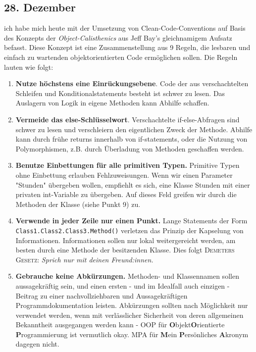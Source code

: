 \subsection{28. Dezember}
ich habe mich heute mit der Umsetzung von Clean-Code-Conventions auf Basis des Konzepts der \textit{Object-Calisthenics} aus Jeff Bay's gleichnamigem Aufsatz befasst. Diese Konzept ist eine Zusammenstellung aus 9 Regeln, die lesbaren und einfach zu wartenden objektorientierten Code ermöglichen sollen. Die Regeln lauten wie folgt:
\begin{enumerate}
    \item \textbf{Nutze höchstens eine Einrückungsebene}. Code der aus verschachtelten Schleifen und Konditionalstatements besteht ist schwer zu lesen. Das Auslagern von Logik in eigene Methoden kann Abhilfe schaffen.
    \item \textbf{Vermeide das else-Schlüsselwort}. Verschachtelte if-else-Abfragen sind schwer zu lesen und verschleiern den eigentlichen Zweck der Methode. Abhilfe kann durch frühe returns innerhalb von if-statements, oder die Nutzung von Polymorphismen, z.B. durch Überladung von Methoden geschaffen werden.
    \item \textbf{Benutze Einbettungen für alle primitiven Typen.} Primitive Typen ohne Einbettung erlauben Fehlzuweisungen. Wenn wir einen Parameter "Stunden" übergeben wollen, empfiehlt es sich, eine Klasse Stunden mit einer privaten int-Variable zu übergeben. Auf dieses Feld greifen wir durch die Methoden der Klasse (siehe Punkt 9) zu.
    \item \textbf{Verwende in jeder Zeile nur einen Punkt.} Lange Statements der Form \\ \texttt{Class1.Class2.Class3.Method()} verletzen das Prinzip der Kapselung von Informationen. Informationen sollen nur lokal weitergereicht werden, am besten durch eine Methode der besitzenden Klasse. Dies folgt \textsc{Demeters Gesetz}: \textit{Sprich nur mit deinen Freund:innen.}
    \item \textbf{Gebrauche keine Abkürzungen.} Methoden- und Klassennamen sollen aussagekräftig sein, und einen ersten - und im Idealfall auch einzigen - Beitrag zu einer nachvollziehbaren und Aussagekräftigen Programmdokumentation leisten. Abkürzungen sollten nach Möglichkeit nur verwendet werden, wenn mit verlässlicher Sicherheit von deren allgemeinen Bekanntheit ausgegangen werden kann - OOP für \textbf{O}bjekt\textbf{O}rientierte \textbf{P}rogrammierung ist vermutlich okay. MPA für \textbf{M}ein \textbf{P}ersönliches \textbf{A}kronym dagegen nicht.

\end{enumerate}

